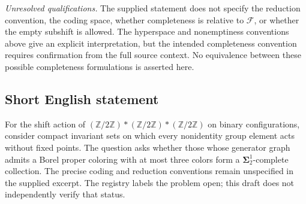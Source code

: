 \documentclass[11pt]{article}
\newcommand{\Z}{\mathbb{Z}}
\begin{document}
\emph{Unresolved qualifications.} The supplied statement does not specify the reduction convention, the coding space, whether completeness is relative to \(\mathcal F\), or whether the empty subshift is allowed. The hyperspace and nonemptiness conventions above give an explicit interpretation, but the intended completeness convention requires confirmation from the full source context. No equivalence between these possible completeness formulations is asserted here.
\subsection{Short English statement}
For the shift action of \((\Z/2\Z)*(\Z/2\Z)*(\Z/2\Z)\) on binary configurations, consider compact invariant sets on which every nonidentity group element acts without fixed points. The question asks whether those whose generator graph admits a Borel proper coloring with at most three colors form a \(\boldsymbol\Sigma^1_2\)-complete collection. The precise coding and reduction conventions remain unspecified in the supplied excerpt. The registry labels the problem open; this draft does not independently verify that status.
\end{document}
